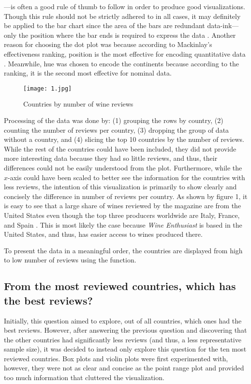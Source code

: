 \noindent ---is often a good rule of thumb to follow in order to produce good visualizations. Though this rule should not be strictly adhered to in all cases, it may definitely be applied to the bar chart since the area of the bars are redundant data-ink---only the position where the bar ends is required to express the data \cite{Tufte}. Another reason for choosing the dot plot was because according to Mackinlay's effectiveness ranking, position is the most effective for encoding quantitative data \cite{Mackinlay}. Meanwhile, hue was chosen to encode the continents because according to the ranking, it is the second most effective for nominal data.

\begin{figure}[h]
  \texttt{[image: 1.jpg]}  
  \caption{Countries by number of wine reviews}
\end{figure}

Processing of the data was done by: (1) grouping the rows by country, (2) counting the number of reviews per country, (3) dropping the group of data without a country, and (4) slicing the top 10 countries by the number of reviews. While the rest of the countries could have been included, they did not provide more interesting data because they had so little reviews, and thus, their differences could not be easily understood from the plot. Furthermore, while the $x$-axis could have been scaled to better see the information for the countries with less reviews, the intention of this visualization is primarily to show clearly and concisely the difference in number of reviews per country. As shown by figure 1, it is easy to see that a large share of wines reviewed by the magazine are from the United States even though the top three producers worldwide are Italy, France, and Spain \cite{Statista}. This is most likely the case because \emph{Wine Enthusiast} is based in the United States, and thus, has easier access to wines produced there.



To present the data in a meaningful order, the countries are displayed from high to low number of reviews using the  function.

\subsection{From the most reviewed countries, which has the best reviews?}
Initially, this question aimed to explore, out of all countries, which ones had the best reviews. However, after answering the previous question and discovering that the other countries had significantly less reviews (and thus, a less representative sample size), it was decided to instead only explore this question for the ten most reviewed countries. Box plots and violin plots were first experimented with, however, they were not as clear and concise as the point range plot and provided too much information that cluttered the visualization. 

